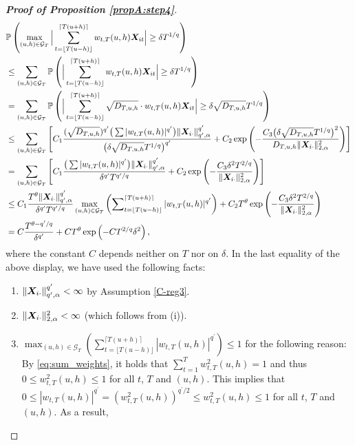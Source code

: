 \begin{proof}[\textnormal{\textbf{Proof of Proposition \ref{propA:step4}}}]
\begin{align}
&\mathbb{P}\left(\max_{(u, h) \in \mathcal{G}_T} \Big| \sum_{t=\lfloor T(u-h) \rfloor}^{\lceil T(u+h) \rceil} w_{t,T}(u,h) \boldsymbol{X}_{it}  \Big| \geq \delta T^{1/q} \right) \nonumber \\
&\leq \sum_{(u, h) \in \mathcal{G}_T} \mathbb{P} \left( \Big| \sum_{t=\lfloor T(u-h) \rfloor}^{\lceil T(u+h) \rceil} w_{t,T}(u,h) \boldsymbol{X}_{it}  \Big| \geq \delta T^{1/q} \right) \nonumber \\
&= \sum_{(u, h) \in \mathcal{G}_T} \mathbb{P} \left( \Big| \sum_{t=\lfloor T(u-h) \rfloor}^{\lceil T(u+h) \rceil} \sqrt{D_{T, u, h}}\cdot w_{t,T}(u,h) \boldsymbol{X}_{it}  \Big| \geq \delta\sqrt{D_{T, u, h}}T^{1/q}  \right) \nonumber \\
&\leq \sum_{(u, h) \in \mathcal{G}_T} \left[C_1 \frac{(\sqrt{D_{T, u, h}})^{q^\prime}\big( \sum |w_{t,T}(u,h)|^{q^\prime}\big) \| \boldsymbol{X}_{i\cdot}\|^{q^\prime}_{q^\prime, \alpha}}{ \big(\delta\sqrt{D_{T, u, h}}T^{1/q}\big)^{q^\prime}} + C_2 \exp \left(-\frac{C_3 \big(\delta\sqrt{D_{T, u, h}}T^{1/q} \big)^2}{D_{T, u, h}\| \boldsymbol{X}_{i\cdot}\|^{2}_{2, \alpha}}\right) \right] \nonumber \\
&= \sum_{(u, h) \in \mathcal{G}_T} \left[C_1 \frac{\big( \sum |w_{t,T}(u,h)|^{q^\prime}\big) \| \boldsymbol{X}_{i\cdot}\|^{q^\prime}_{q^\prime, \alpha}}{\delta^{q^\prime}T^{q^\prime/q} } + C_2 \exp \left(-\frac{C_3 \delta^2 T^{2/q} }{\|\boldsymbol{X}_{i\cdot}\|^{2}_{2, \alpha}}\right) \right] \nonumber \\
&\leq C_1 \frac{ T^\theta \|\boldsymbol{X}_{i\cdot}\|^{q^\prime}_{q^\prime, \alpha}}{\delta^{q^\prime} T^{q^\prime/q}} \max_{(u, h) \in \mathcal{G}_T} \left( \sum\nolimits_{t=\lfloor T(u-h) \rfloor}^{\lceil T(u+h) \rceil} |w_{t,T}(u,h)|^{q^\prime}\right)+ C_2 T^\theta \exp \left(-\frac{C_3 \delta^2 T^{2/q}}{\|\boldsymbol{X}_{i\cdot}\|^{2}_{2, \alpha}}\right) \nonumber \\
&= C \frac{ T^{\theta - q^\prime/q}}{\delta^{q^\prime}} + C T^\theta \exp \left(-C T^{2/q} \delta^2\right), \label{eq:exp-bound-BnT}
\end{align}
where the constant $C$ depends neither on $T$ nor on $\delta$. In the last equality of the above display, we have used the following facts:
\begin{enumerate}[label=(\roman*),leftmargin=0.85cm]
\item $\|\boldsymbol{X}_{i\cdot}\|^{q^\prime}_{q^\prime, \alpha}  < \infty$ by Assumption \ref{C-reg3}.
\item $\|\boldsymbol{X}_{i\cdot}\|^{2}_{2, \alpha} < \infty$ (which follows from (i)).
\item $\max_{(u, h) \in \mathcal{G}_T} ( \sum_{t=\lfloor T(u-h) \rfloor}^{\lceil T(u+h) \rceil} |w_{t,T}(u,h)|^{q^\prime} ) \leq 1$ for the following reason: By \eqref{eq:sum_weights}, it holds that $\sum_{t=1}^{T} w^2_{t,T}(u,h) = 1$ and thus $0 \leq w^2_{t,T}(u,h) \leq 1$ for all $t$, $T$ and $(u, h)$. This implies that $0 \leq |w_{t,T}(u,h)|^{q^\prime} =  (w^2_{t,T}(u,h))^{q^\prime/2} \leq w^2_{t,T}(u,h) \leq 1$ for all $t$, $T$ and $(u, h)$. As a result, 

\end{enumerate}
\end{proof}
